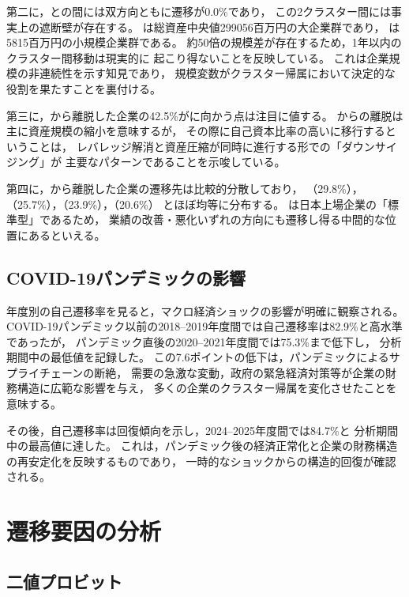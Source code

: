 第二に，との間には双方向ともに遷移が0.0\%であり，
この2クラスター間には事実上の遮断壁が存在する。
は総資産中央値\num{299056}百万円の大企業群であり，
は\num{5815}百万円の小規模企業群である。
約50倍の規模差が存在するため，1年以内のクラスター間移動は現実的に
起こり得ないことを反映している。
これは企業規模の非連続性を示す知見であり，
規模変数がクラスター帰属において決定的な役割を果たすことを裏付ける。

第三に，から離脱した企業の42.5\%がに向かう点は注目に値する。
からの離脱は主に資産規模の縮小を意味するが，
その際に自己資本比率の高いに移行するということは，
レバレッジ解消と資産圧縮が同時に進行する形での「ダウンサイジング」が
主要なパターンであることを示唆している。

第四に，から離脱した企業の遷移先は比較的分散しており，
（29.8\%），（25.7\%），（23.9\%），（20.6\%）
とほぼ均等に分布する。
は日本上場企業の「標準型」であるため，
業績の改善・悪化いずれの方向にも遷移し得る中間的な位置にあるといえる。

\subsection{COVID-19パンデミックの影響}

年度別の自己遷移率を見ると，マクロ経済ショックの影響が明確に観察される。
COVID-19パンデミック以前の2018--2019年度間では自己遷移率は82.9\%と高水準であったが，
パンデミック直後の2020--2021年度間では75.3\%まで低下し，
分析期間中の最低値を記録した。
この7.6ポイントの低下は，パンデミックによるサプライチェーンの断絶，
需要の急激な変動，政府の緊急経済対策等が企業の財務構造に広範な影響を与え，
多くの企業のクラスター帰属を変化させたことを意味する。

その後，自己遷移率は回復傾向を示し，2024--2025年度間では84.7\%と
分析期間中の最高値に達した。
これは，パンデミック後の経済正常化と企業の財務構造の再安定化を反映するものであり，
一時的なショックからの構造的回復が確認される。

\section{遷移要因の分析}
\label{sec:results-probit}

\subsection{二値プロビット}

